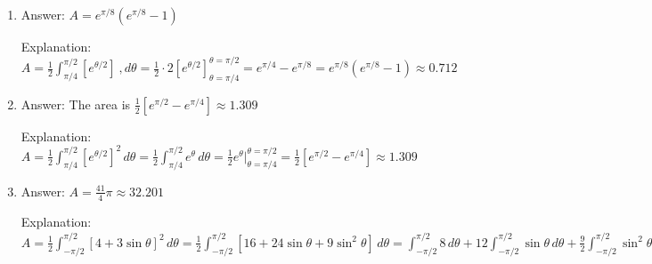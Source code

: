 \begin{Answer}[ref = polar4]
\begin{enumerate}
\item Answer: $A = e^{\pi/8} \left( e^{\pi/8} - 1 \right)$

Explanation: $A = \frac{1}{2} \int_{\pi/4}^{\pi/2} \left[ e^{\theta/2} \right]\
,d\theta = \frac{1}{2} \cdot 2 \left[e^{\theta/2} \right]_{\theta = \pi/4}^{
\theta = \pi/2} = e^{\pi/4} - e^{\pi/8} = e^{\pi/8} \left( e^{\pi/8} - 1 
\right) \approx 0.712$

\item Answer: The area is $\frac{1}{2} \left[ e^{\pi/2} - e^{\pi/4} \right] 
\approx 1.309$

Explanation: $A = \frac{1}{2} \int_{\pi/4}^{\pi/2} \left[ e^{\theta/2} \right]^
2 \,d\theta = \frac{1}{2} \int_{\pi/4}^{\pi/2} e^{\theta}\,d\theta = \frac{1}{2
} e^{\theta}|_{\theta = \pi/4}^{\theta = \pi/2} = \frac{1}{2} \left[ e^{\pi/2} 
- e^{\pi/4} \right] \approx 1.309$

\item Answer: $A = \frac{41}{4} \pi \approx 32.201$

Explanation: $A = \frac{1}{2} \int_{-\pi/2} ^ {\pi/2} \left[4 + 3\sin{\theta} 
\right]^2\,d\theta = \frac{1}{2} \int_{-\pi/2}^{\pi/2} \left[ 16 + 24\sin{
\theta} + 9\sin^2{\theta} \right]\,d\theta = \int_{-\pi/2}^{\pi/2} 8\,d\theta 
+ 12 \int_{-\pi/2}^{\pi/2} \sin{\theta}\,d\theta + \frac{9}{2} \int_{-\pi/2}^{
\pi/2} \sin^2{\theta}\,d\theta = \left[ 8 \theta \right]_{\theta = -\pi/2}^{
\theta = \pi/2} + 12 \left[ -\cos{\theta} \right]_{\theta = -\pi/2}^{\theta = 
\pi/2} + \frac{9}{2} \int_{-\pi/2}^{\pi/2} \frac{1 - \cos{2\theta}}{2}\,d\theta
= 8 \left[ \left(\frac{\pi}{2} \right) - \left( \frac{-\pi}{2} \right) \right] 
+ 12 \left[ \left(-\cos{\frac{\pi}{2}} \right) - \left( -\cos{\frac{-\pi}{2}} 
\right) \right] + \frac{9}{4} \int_{-\pi/2}^{\pi/2} 1\,d\theta - \frac{9}{4} 
\int_{-\pi/2}^{\pi/2} \cos{2\theta}\,d\theta = 8\pi + 12 \left(0 - 0 \right) + 
\frac{9}{4} \left[ \theta \right]_{\theta = -\pi/2}^{\theta = \pi/2} - \frac{9
}{4} \left[ \frac{1}{2} \sin{2\theta} \right]_{\theta = -\pi/2}^{\theta = \pi/
2} = 8\pi + \frac{9}{4} \left[ \left( \frac{\pi}{2} \right) - \left( - \frac{
\pi}{2} \right) \right] - \frac{9}{8} \left[ \sin{ \left( 2 \cdot \frac{\pi}{2}
\right)} - \sin{\left( 2 \cdot -\frac{\pi}{2} \right)} \right] = 8\pi + \frac{9
}{4} \pi - \frac{9}{8} \left[ \sin{\left( \pi \right)} - \sin{ \left( -\pi 
\right)} \right] = \frac{41}{4} \pi - \frac{9}{8} \left[ 0 - \left( -0 \right) 
\right] = \frac{41}{4}\pi \approx 32.201$
\end{enumerate}
\end{Answer}

